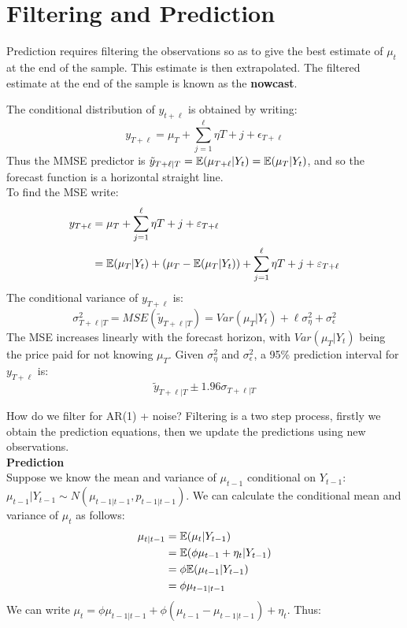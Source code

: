 \documentclass[DIV=14,titlepage=false]{scrreprt}
\begin{document}
\section{Filtering and Prediction}
Prediction requires filtering the observations so as to give the best estimate of $\mu_t$ at the end of the sample. This estimate is then extrapolated. The filtered estimate at the end of the sample is known as the \textbf{nowcast}.
\begin{example}
The conditional distribution of $y_{t+\ell}$ is obtained by writing:
\[
    y_{T+\ell} = \mu_{T} + \sum_{j=1}^\ell \eta {T+j} + \epsilon_{T+\ell}
\]
Thus the MMSE predictor is $\tilde y_{T+\ell|T} = \mathbb{E}( \mu_{T+\ell} | Y_t) = \mathbb{E}(\mu_T|Y_t)$, and so the forecast function is a horizontal straight line.\\
To find the MSE write:
\begin{align*}
    y_{T+\ell} &= \mu_{T} + \sum_{j=1}^\ell \eta {T+j} + \varepsilon_{T+\ell}\\
    &= \mathbb{E}(\mu_T|Y_t) + (\mu_T - \mathbb{E}(\mu_T|Y_t)) + \sum_{j=1}^\ell \eta {T+j} + \varepsilon_{T+\ell}
\end{align*}
The conditional variance of $y_{T+\ell}$ is:
\[
    \sigma^2_{T+\ell|T} = MSE(\tilde y_{T+\ell|T}) = Var(\mu_T | Y_t) + \ell \sigma^2_\eta + \sigma^2_\epsilon
\]
The MSE increases linearly with the forecast horizon, with $Var(\mu_T|Y_t)$ being the price paid for not knowing $\mu_T$. Given $\sigma^2_\eta$ and $\sigma^2_\epsilon$, a 95\% prediction interval for $y_{T+\ell}$ is:
\[
    \tilde y_{T+\ell|T} \pm 1.96 \sigma_{T+\ell|T}
\]
\end{example}
How do we filter for AR(1) + noise? Filtering is a two step process, firstly we obtain the prediction equations, then we update the predictions using new observations.\\
\textbf{Prediction}\\
Suppose we know the mean and variance of $\mu_{t-1}$ conditional on $Y_{t-1}$: $\mu_{t-1}|Y_{t-1} \sim N(\mu_{t-1|t-1}, p_{t-1|t-1})$. We can calculate the conditional mean and variance of $\mu_t$ as follows:
\begin{align*}
    \mu_{t|t-1} &= \mathbb{E}(\mu_t|Y_{t-1}) \\
    &= \mathbb{E}(\phi \mu_{t-1} + \eta_t|Y_{t-1})\\
    &= \phi \mathbb{E}(\mu_{t-1}|Y_{t-1}) \\
    &= \phi \mu_{t-1|t-1}
\end{align*}
We can write $\mu_t = \phi \mu_{t-1|t-1} + \phi(\mu_{t-1} - \mu_{t-1|t-1}) + \eta_t$. Thus:
\end{document}
